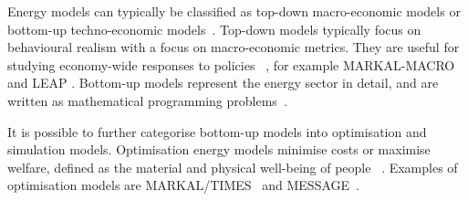 


Energy models can typically be classified as top-down macro-economic models or bottom-up techno-economic models~\cite{Bohringer1998}. Top-down models typically focus on behavioural realism with a focus on macro-economic metrics. They are useful for studying economy-wide responses to policies ~\cite{Hall2016}, for example MARKAL-MACRO \cite{Fishbone1981} and LEAP \cite{Heaps2016}. Bottom-up models represent the energy sector in detail, and are written as mathematical programming problems~\cite{Gargiulo2013}. %

It is possible to further categorise bottom-up models into optimisation and simulation models. Optimisation energy models minimise costs or maximise welfare, defined as the material and physical well-being of people ~\cite{Keles2017}. Examples of optimisation models are MARKAL/TIMES~\cite{Fishbone1981} and MESSAGE~\cite{Schrattenholzer1981}. %

